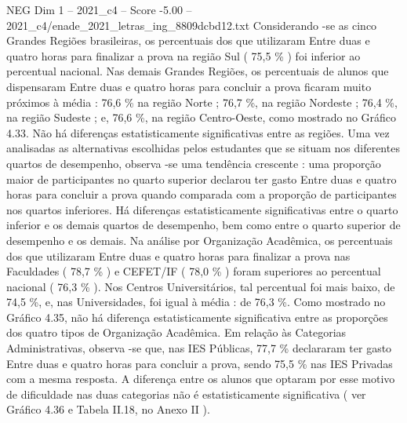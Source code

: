 \begin{textsample}{NEG Dim 1 – 2021\_c4 – Score -5.00 – 2021\_c4/enade\_2021\_letras\_ing\_8809dcbd12.txt}
Considerando -se as cinco Grandes Regiões brasileiras, os percentuais dos que utilizaram Entre duas e quatro horas para finalizar a prova na região Sul ( 75,5 \% ) foi inferior ao percentual nacional.
Nas demais Grandes Regiões, os percentuais de alunos que dispensaram Entre duas e quatro horas para concluir a prova ficaram muito próximos à média : 76,6 \% na região Norte ; 76,7 \%, na região Nordeste ; 76,4 \%, na região Sudeste ; e, 76,6 \%, na região Centro-Oeste, como mostrado no Gráfico 4.33.
Não há diferenças estatisticamente significativas entre as regiões.
Uma vez analisadas as alternativas escolhidas pelos estudantes que se situam nos diferentes quartos de desempenho, observa -se uma tendência crescente : uma proporção maior de participantes no quarto superior declarou ter gasto Entre duas e quatro horas para concluir a prova quando comparada com a proporção de participantes nos quartos inferiores.
Há diferenças estatisticamente significativas entre o quarto inferior e os demais quartos de desempenho, bem como entre o quarto superior de desempenho e os demais.
Na análise por Organização Acadêmica, os percentuais dos que utilizaram Entre duas e quatro horas para finalizar a prova nas Faculdades ( 78,7 \% ) e CEFET/IF ( 78,0 \% ) foram superiores ao percentual nacional ( 76,3 \% ).
Nos Centros Universitários, tal percentual foi mais baixo, de 74,5 \%, e, nas Universidades, foi igual à média : de 76,3 \%.
Como mostrado no Gráfico 4.35, não há diferença estatisticamente significativa entre as proporções dos quatro tipos de Organização Acadêmica.
Em relação às Categorias Administrativas, observa -se que, nas IES Públicas, 77,7 \% declararam ter gasto Entre duas e quatro horas para concluir a prova, sendo 75,5 \% nas IES Privadas com a mesma resposta.
A diferença entre os alunos que optaram por esse motivo de dificuldade nas duas categorias não é estatisticamente significativa ( ver Gráfico 4.36 e Tabela II.18, no Anexo II ).

\end{textsample}

